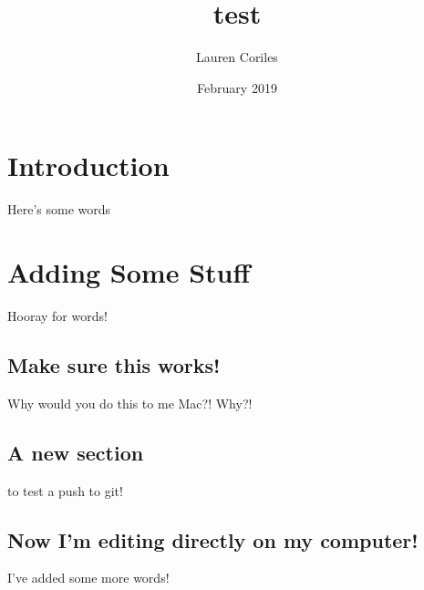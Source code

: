 \documentclass{article}
\title{test}
\author{Lauren Coriles}
\date{February 2019}
\begin{document}
\maketitle

\section{Introduction}
Here's some words

\section{Adding Some Stuff}
Hooray for words!

\subsection{Make sure this works!}
Why would you do this to me Mac?! Why?!

\subsection{A new section}
to test a push to git!

\subsection{Now I'm editing directly on my computer!}
I've added some more words!
\end{document}
